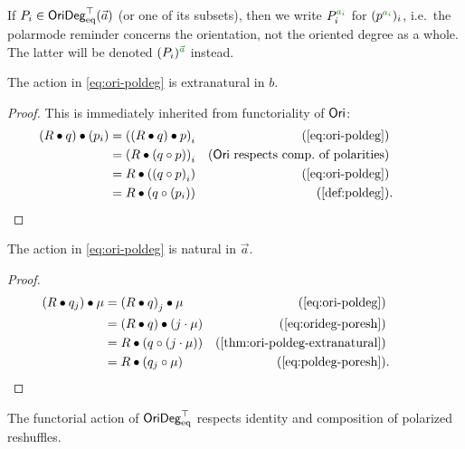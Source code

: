 \documentclass[a4paper]{memoir}
\begin{document}
\begin{notation} \label{not:polarmode-reminder-orideg}
	If $P_i \in \mathsf{OriDeg}_{\mathrm{eq}}^\top(\vec a)$ (or one of its subsets), then we write $P_i\pmr{a_i}$ for $(p \pmr{a_i})_i$, i.e.\ the polarmode reminder concerns the orientation, not the oriented degree as a whole.
	The latter will be denoted $(P_i) \pmr{\vec a}$ instead.
\end{notation}
\begin{proposition} \label{thm:ori-poldeg-extranatural}
	The action in \cref{eq:ori-poldeg} is extranatural in $b$.
\end{proposition}
\begin{proof}
	This is immediately inherited from functoriality of ${\mathsf{Ori}}$:
	\begin{align*}
		(R \oriof q) \oriof (\pdeg p i)
		&= \pdeg{((R \oriof q) \oriof p)}{i}
		& \text{(\cref{eq:ori-poldeg})} \\
		&= \pdeg{(R \oriof (q \circ p))}{i}
		& \text{($\oripsh$ respects comp.\ of polarities)} \\
		&= R \oriof (\pdeg{(q \circ p)}{i})
		& \text{(\cref{eq:ori-poldeg})} \\
		&= R \oriof (q \circ (\pdeg p i))
		& \text{(\cref{def:poldeg})} &. \qquad \qedhere
	\end{align*}
\end{proof}
\begin{proposition} \label{thm:ori-poldeg-natural}
	The action in \cref{eq:ori-poldeg} is natural in $\vec a$.
\end{proposition}
\begin{proof}
	\begin{align*}
		(R \oriof \pdeg q j) \oriof \mu 
		&= \odeg{(R \oriof q)}{j} \oriof \mu 
		& \text{(\cref{eq:ori-poldeg})} \\
		&= (R \oriof q) \oriof (j \cdot \mu)
		& \text{(\cref{eq:orideg-poresh})} \\
		&= R \oriof (q \circ (j \cdot \mu))
		& \text{(\cref{thm:ori-poldeg-extranatural})} \\
		&= R \oriof (\pdeg q j \circ \mu)
		& \text{(\cref{eq:poldeg-poresh})} &. \qquad \qedhere
	\end{align*}
\end{proof}
\begin{proposition} \label{thm:orideg-functor-laws}
	The functorial action of $\mathsf{OriDeg}_{\mathrm{eq}}^\top$ respects identity and composition of polarized reshuffles.
\end{proposition}
\end{document}
